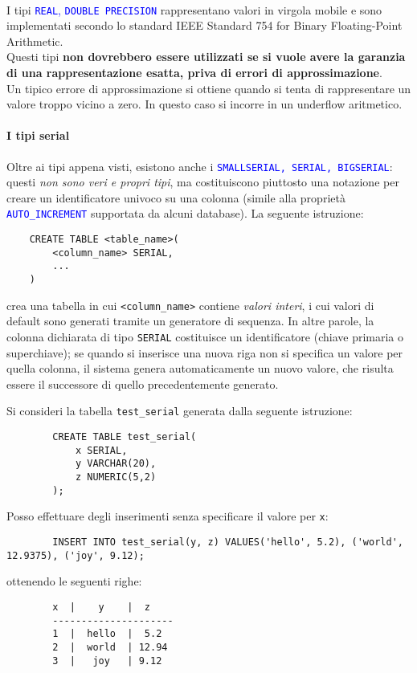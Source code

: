 \documentclass[12pt,a4paper]{book}
\begin{document}
	\paragraph{}I tipi \textcolor{blue}{\texttt{REAL}, \texttt{DOUBLE PRECISION}} rappresentano valori in virgola mobile e sono implementati secondo lo standard IEEE Standard 754 for Binary Floating-Point Arithmetic.\\Questi tipi \textbf{non dovrebbero essere utilizzati se si vuole avere la garanzia di una rappresentazione esatta, priva di errori di approssimazione}. \\
	Un tipico errore di approssimazione si ottiene quando si tenta di rappresentare un valore troppo vicino a zero. In questo caso si incorre in un underflow aritmetico.
	\paragraph{I tipi serial} Oltre ai tipi appena visti, esistono anche i \textcolor{blue}{\texttt{SMALLSERIAL, SERIAL, BIGSERIAL}}: questi \textit{non sono veri e propri tipi}, ma costituiscono piuttosto una notazione per creare un identificatore univoco su una colonna (simile alla proprietà \textcolor{blue}{\texttt{AUTO_INCREMENT}} supportata da alcuni database).
	La seguente istruzione:
	\begin{lstlisting}
	CREATE TABLE <table_name>(
		<column_name> SERIAL,
		...
	)
	\end{lstlisting}
	crea una tabella in cui \texttt{<column_name>} contiene \textit{valori interi}, i cui valori di default sono generati tramite un generatore di sequenza. In altre parole, la colonna dichiarata di tipo \texttt{SERIAL} costituisce un identificatore (chiave primaria o superchiave); se quando si inserisce una nuova riga non si specifica un valore per quella colonna, il sistema genera automaticamente un nuovo valore, che risulta essere il successore di quello precedentemente generato.\\
	\begin{tcolorbox}[enhanced jigsaw, breakable, title=Esempio, title filled]
		Si consideri la tabella \texttt{test_serial} generata dalla seguente istruzione:
		\begin{lstlisting}
		CREATE TABLE test_serial(
			x SERIAL,
			y VARCHAR(20),
			z NUMERIC(5,2)
		);
		\end{lstlisting}
		Posso effettuare degli inserimenti senza specificare il valore per \texttt{x}:
		\begin{lstlisting}
		INSERT INTO test_serial(y, z) VALUES('hello', 5.2), ('world', 12.9375), ('joy', 9.12);
		\end{lstlisting}
		ottenendo le seguenti righe:
		\begin{lstlisting}
		x  |    y    |  z
		---------------------
		1  |  hello  |  5.2
		2  |  world  | 12.94
		3  |   joy   | 9.12
		\end{lstlisting}
	\end{tcolorbox}
\end{document}
